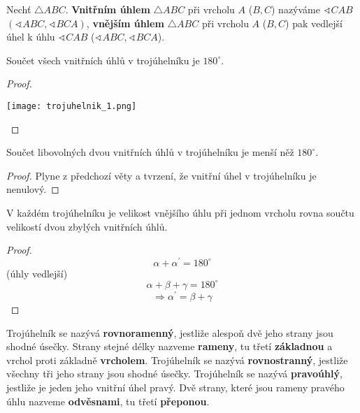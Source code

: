 \begin{definition}
  Nechť $\triangle ABC$. \textbf{Vnitřním úhlem} $\triangle ABC$ při vrcholu $A$ ($B, C$) nazýváme $\sphericalangle CAB$ $(\sphericalangle ABC, \sphericalangle BCA)$, \textbf{vnějším úhlem} $\triangle ABC$ při vrcholu $A$ ($B, C$) pak vedlejší úhel k úhlu $\sphericalangle CAB$ ($\sphericalangle ABC, \sphericalangle BCA$).
\end{definition}

\begin{veta}
  Součet všech vnitřních úhlů v trojúhelníku je $180^\circ$.
\end{veta}

\begin{proof}
  $ $ \newline
  \begin{center}
   \texttt{[image: trojuhelnik\_1.png]}
  \end{center}
\end{proof}

\begin{veta}
  Součet libovolných dvou vnitřních úhlů v trojúhelníku je menší něž $180^\circ$.
\end{veta}

\begin{proof}
  Plyne z předchozí věty a tvrzení, že vnitřní úhel v trojúhelníku je nenulový.
\end{proof}

\begin{veta}
  V každém trojúhelníku je velikost vnějšího úhlu při jednom vrcholu rovna součtu velikostí dvou zbylých vnitřních úhlů.
\end{veta}

\begin{proof}
  $$\alpha + \alpha^\prime = 180^\circ$$ (úhly vedlejší)
  $$\alpha + \beta + \gamma = 180^\circ$$
  $$\Rightarrow \alpha^\prime = \beta + \gamma$$
\end{proof}

\begin{definition}
  Trojúhelník se nazývá \textbf{rovnoramenný}, jestliže alespoň dvě jeho strany jsou shodné úsečky. Strany stejné délky nazveme \textbf{rameny}, tu třetí \textbf{základnou} a vrchol proti základně \textbf{vrcholem}.
  Trojúhelník se nazývá \textbf{rovnostranný}, jestliže všechny tři jeho strany jsou shodné úsečky.
  Trojúhelník se nazývá \textbf{pravoúhlý}, jestliže je jeden jeho vnitřní úhel pravý. Dvě strany, které jsou rameny pravého úhlu nazveme \textbf{odvěsnami}, tu třetí \textbf{přeponou}.
\end{definition}

